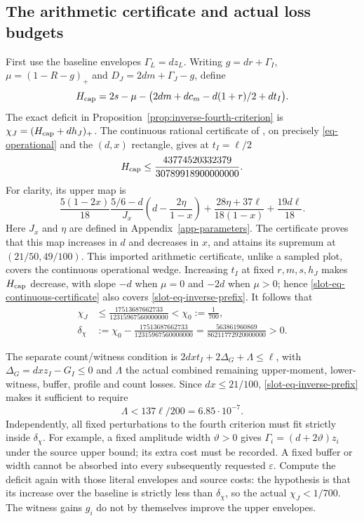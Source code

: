 \documentclass[11pt]{article}
\theoremstyle{definition}
\newcommand{\eps}{\varepsilon}
\begin{document}
\subsection{The arithmetic certificate and actual loss budgets}
First use the baseline envelopes $\Gamma_L=dz_L$.
Writing $g=dr+\Gamma_I$, $\mu=(1-R-g)_+$ and
$D_J=2dm+\Gamma_J-g$, define
\[
 H_{\rm cap}=2s-\mu-
       \bigl(2dm+dc_m-d(1+r)/2+dt_I\bigr).
\]
The exact deficit in Proposition~\ref{prop:inverse-fourth-criterion} is
$\chi_J=(H_{\rm cap}+dh_J)_+$.
The continuous rational certificate of \cite{n9}, on precisely
\eqref{eq-operational} and the $(d,x)$ rectangle, gives at $t_I=\ell/2$
\begin{equation}
 H_{\rm cap}\le
 \frac{43774520332379}{30789918900000000}.
 \label{slot-eq-continuous-certificate}
\end{equation}
For clarity, its upper map is
\[
 \frac{5(1-2x)}{18}\frac{5/6-d}{J_x}
       \left(d-\frac{2\eta}{1-x}\right)
 +\frac{28\eta+37\ell}{18(1-x)}+\frac{19d\ell}{18}.
\]
Here $J_x$ and $\eta$ are defined in Appendix~\ref{app-parameters}.
The certificate proves that this map increases in $d$ and decreases
in $x$, and attains its supremum at $(21/50,49/100)$.
This imported arithmetic certificate, unlike a sampled plot, covers
the continuous operational wedge.  Increasing $t_I$ at fixed
$r,m,s,h_J$ makes $H_{\rm cap}$ decrease, with slope $-d$ when
$\mu=0$ and $-2d$ when $\mu>0$; hence
\eqref{slot-eq-continuous-certificate} also covers
\eqref{slot-eq-inverse-prefix}.  It follows that
\begin{equation}\begin{aligned}
 \chi_J&\le
 \frac{17513687662733}{12315967560000000}<\chi_0:=\frac1{700},
 \\
 \delta_\chi&:=\chi_0-
 \frac{17513687662733}{12315967560000000}
 =\frac{563861960869}{86211772920000000}>0.
 \end{aligned}
 \label{slot-eq-common-saving}
\end{equation}

The separate count/witness condition is
$2dx t_I+2\Delta_G+\Lambda\le\ell$, with
$\Delta_G=dx z_I-G_I\le0$ and $\Lambda$ the actual combined remaining
upper-moment, lower-witness, buffer, profile and count losses.
Since $dx\le21/100$, \eqref{slot-eq-inverse-prefix} makes it sufficient
to require
\begin{equation}
 \Lambda<137\ell/200=6.85\cdot10^{-7}.
 \label{slot-eq-witness-loss}
\end{equation}
Independently, all fixed perturbations to the fourth criterion must fit
strictly inside $\delta_\chi$.  For example, a fixed amplitude width
$\vartheta>0$ gives $\Gamma_i=(d+2\vartheta)z_i$ under the source upper
bound; its extra cost must be recorded.  A fixed buffer or width cannot
be absorbed into every subsequently requested $\eps$.
Compute the deficit again with those literal envelopes and source costs:
the hypothesis is that its increase over the baseline is strictly less
than $\delta_\chi$, so the actual $\chi_J<1/700$.
The witness gains $g_i$ do not by themselves improve the upper envelopes.
\end{document}

